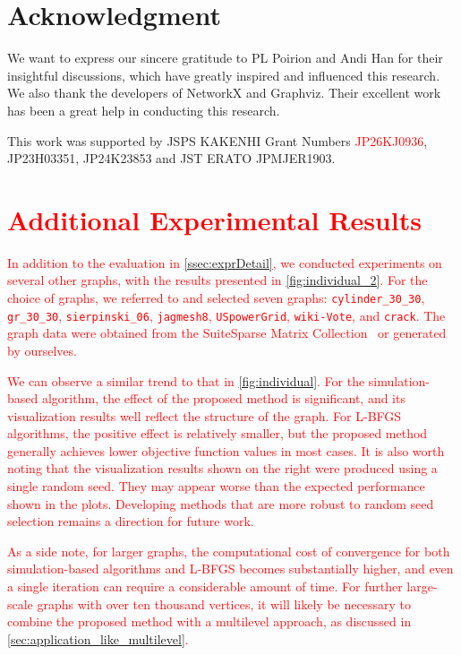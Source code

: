 \documentclass[11pt]{article}
\newcommand{\red}[1]{\textcolor{red}{#1}}
\begin{document}
\section*{Acknowledgment}

We want to express our sincere gratitude to PL Poirion and Andi Han for their insightful discussions, which have greatly inspired and influenced this research.
We also thank the developers of NetworkX and Graphviz.
Their excellent work has been a great help in conducting this research.

This work was supported by JSPS KAKENHI Grant Numbers \red{JP26KJ0936}, JP23H03351, JP24K23853 and JST ERATO JPMJER1903.




\appendix

\section{\red{Additional Experimental Results}}
\label{app:large_graphs}

\red{
  In addition to the evaluation in \cref{ssec:exprDetail}, we conducted experiments on several other graphs, with the results presented in \cref{fig:individual_2}.
  For the choice of graphs, we referred to \citep{arleoDistributedMultilevelForceDirected2019,bartelExperimentalEvaluationMultilevel2011} and selected seven graphs: \texttt{cylinder\_30\_30}, \texttt{gr\_30\_30}, \texttt{sierpinski\_06}, \texttt{jagmesh8}, \texttt{USpowerGrid}, \texttt{wiki-Vote}, and \texttt{crack}.
  The graph data were obtained from the SuiteSparse Matrix Collection~\citep{davisUniversityFloridaSparse2011} or generated by ourselves.
}

\red{
  We can observe a similar trend to that in \cref{fig:individual}.
  For the simulation-based algorithm, the effect of the proposed method is significant, and its visualization results well reflect the structure of the graph.
  For L-BFGS algorithms, the positive effect is relatively smaller, but the proposed method generally achieves lower objective function values in most cases.
  It is also worth noting that the visualization results shown on the right were produced using a single random seed.
  They may appear worse than the expected performance shown in the plots.
  Developing methods that are more robust to random seed selection remains a direction for future work.
}

\red{
  As a side note, for larger graphs, the computational cost of convergence for both simulation-based algorithms and L-BFGS becomes substantially higher, and even a single iteration can require a considerable amount of time.
  For further large-scale graphs with over ten thousand vertices, it will likely be necessary to combine the proposed method with a multilevel approach, as discussed in \cref{sec:application_like_multilevel}.
}
\end{document}
